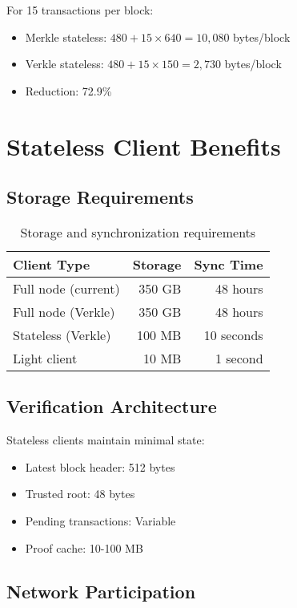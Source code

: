 \documentclass[11pt,a4paper]{article}
\theoremstyle{definition}
\begin{document}
For 15 transactions per block:
\begin{itemize}
    \item Merkle stateless: $480 + 15 \times 640 = 10,080$ bytes/block
    \item Verkle stateless: $480 + 15 \times 150 = 2,730$ bytes/block
    \item Reduction: 72.9\%
\end{itemize}

\section{Stateless Client Benefits}

\subsection{Storage Requirements}

\begin{table}[H]
\centering
\begin{tabular}{@{}lrr@{}}
\toprule
\textbf{Client Type} & \textbf{Storage} & \textbf{Sync Time} \\
\midrule
Full node (current) & 350 GB & 48 hours \\
Full node (Verkle) & 350 GB & 48 hours \\
Stateless (Verkle) & 100 MB & 10 seconds \\
Light client & 10 MB & 1 second \\
\bottomrule
\end{tabular}
\caption{Storage and synchronization requirements}
\label{tab:storage}
\end{table}

\subsection{Verification Architecture}

Stateless clients maintain minimal state:
\begin{itemize}
    \item Latest block header: 512 bytes
    \item Trusted root: 48 bytes
    \item Pending transactions: Variable
    \item Proof cache: 10-100 MB
\end{itemize}

\subsection{Network Participation}
\end{document}
